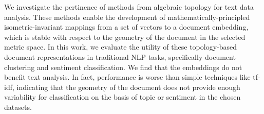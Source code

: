 We investigate the pertinence of methods from algebraic topology for text data analysis. These methods enable the development of mathematically-principled isometric-invariant mappings from a set of vectors to a document embedding, which is stable with respect to the geometry of the document in the selected metric space. In this work, we evaluate the utility of these topology-based document representations in traditional NLP tasks, specifically document clustering and sentiment classification. We find that the embeddings do not benefit text analysis. In fact, performance is worse than simple techniques like tf-idf, indicating that the geometry of the document does not provide enough variability for classification on the basis of topic or sentiment in the chosen datasets.
